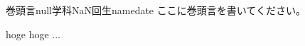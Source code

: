 \documentclass[11pt,b5paper,papersize,dvipdfmx]{jsbook}
\begin{document}
\begin{preface}{巻頭言}{null学科NaN回生}{name}{date}
  ここに巻頭言を書いてください。\par
  hoge hoge ...
\end{preface}
\end{document}
